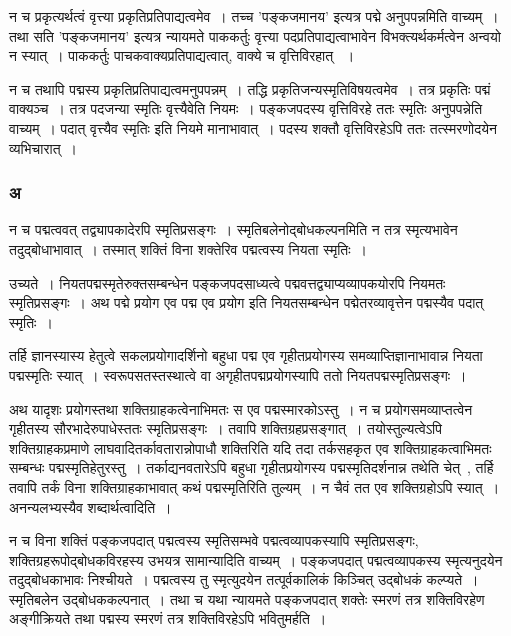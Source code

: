 			न च प्रकृत्यर्थत्वं वृत्त्या प्रकृतिप्रतिपाद्यत्वमेव~।  तच्च ’पङ्कजमानय’ इत्यत्र पद्मे अनुपपन्नमिति वाच्यम्~।  तथा सति ’पङ्कजमानय’ इत्यत्र न्यायमते पाककर्तुः  वृत्त्या पदप्रतिपाद्यत्वाभावेन  विभक्त्यर्थकर्मत्वेन अन्वयो न स्यात्~।  पाककर्तुः पाचकवाक्यप्रतिपाद्यत्वात्, वाक्ये च वृत्तिविरहात् ~। 

			न च तथापि पद्मस्य प्रकृतिप्रतिपाद्यत्वमनुपपन्नम्~।  तद्धि प्रकृतिजन्यस्मृतिविषयत्वमेव~।  तत्र प्रकृतिः पद्मं वाक्यञ्च~।  तत्र पदजन्या स्मृतिः वृत्त्यैवेति नियमः~।  पङ्कजपदस्य वृत्तिविरहे ततः स्मृतिः अनुपपन्नेति वाच्यम्~।  पदात् वृत्त्यैव स्मृतिः इति नियमे मानाभावात्~।  पदस्य शक्तौ वृत्तिविरहेऽपि ततः तत्स्मरणोदयेन व्यभिचारात्~।
		
			\subsubsection{अ}
			
				\begin{small}
				
					न च पद्मत्ववत् तद्व्यापकादेरपि स्मृतिप्रसङ्गः~। स्मृतिबलेनोद्बोधकल्पनमिति न तत्र स्मृत्यभावेन तदुद्बोधाभावात्~। तस्मात् शक्तिं विना शक्तेरिव पद्मत्वस्य नियता स्मृतिः~। 
				
					उच्यते~। नियतपद्मस्मृतेरुक्तसम्बन्धेन पङ्कजपदसाध्यत्वे पद्मवत्तद्व्याप्यव्यापकयोरपि नियमतः स्मृतिप्रसङ्गः~। अथ पद्मे प्रयोग एव पद्म एव प्रयोग इति नियतसम्बन्धेन पद्मेतरव्यावृत्तेन पद्मस्यैव पदात् स्मृतिः~। 
				
					तर्हि ज्ञानस्यास्य हेतुत्वे सकलप्रयोगादर्शिनो बहुधा पद्म एव गृहीतप्रयोगस्य समव्याप्तिज्ञानाभावान्न नियता पद्मस्मृतिः स्यात्~। स्वरूपसतस्तस्थात्वे वा अगृहीतपद्मप्रयोगस्यापि ततो नियतपद्मस्मृतिप्रसङ्गः~। 
	
					अथ यादृशः प्रयोगस्तथा शक्तिग्राहकत्वेनाभिमतः स एव पद्मस्मारकोऽस्तु~। न च प्रयोगसमव्याप्तत्वेन गृहीतस्य सौरभादेरुपाधेस्ततः स्मृतिप्रसङ्गः~। तवापि शक्तिग्रहप्रसङ्गात्~। तयोस्तुल्यत्वेऽपि शक्तिग्राहकप्रमाणे लाघवादितर्कावतारान्नोपाधौ शक्तिरिति यदि तदा तर्कसहकृत एव शक्तिग्राहकत्वाभिमतः सम्बन्धः पद्मस्मृतिहेतुरस्तु~। तर्काद्यनवतारेऽपि बहुधा गृहीतप्रयोगस्य पद्मस्मृतिदर्शनान्न तथेति चेत्~, तर्हि तवापि तर्कं विना शक्तिग्राहकाभावात् कथं पद्मस्मृतिरिति तुल्यम्~। न चैवं तत एव शक्तिग्रहोऽपि स्यात्~। अनन्यलभ्यस्यैव शब्दार्थत्वादिति~। 
				\end{small}
				
				न च विना शक्तिं पङ्कजपदात् पद्मत्वस्य स्मृतिसम्भवे पद्मत्वव्यापकस्यापि स्मृतिप्रसङ्गः, शक्तिग्रहरूपोद्बोधकविरहस्य उभयत्र सामान्यादिति वाच्यम्~।  पङ्कजपदात् पद्मत्वव्यापकस्य स्मृत्यनुदयेन तदुद्बोधकाभावः निश्चीयते~।  पद्मत्वस्य तु स्मृत्युदयेन तत्पूर्वकालिकं  किञ्चित् उद्बोधकं कल्प्यते~।  स्मृतिबलेन उद्बोधककल्पनात्~।  तथा च यथा न्यायमते पङ्कजपदात् शक्तेः स्मरणं तत्र शक्तिविरहेण अङ्गीक्रियते तथा पद्मस्य स्मरणं तत्र शक्तिविरहेऽपि भवितुमर्हति~।

